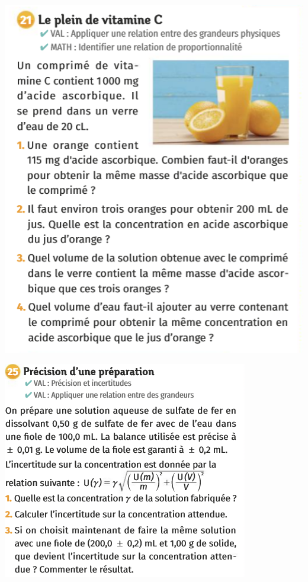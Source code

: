\begin{center}
\includegraphics[scale=1.5]{Images/Chapitre_2/Ex_21.png}
\end{center}
\newpage
\begin{center}
\includegraphics[scale=2]{Images/Chapitre_2/Ex_25.png}
\end{center}

